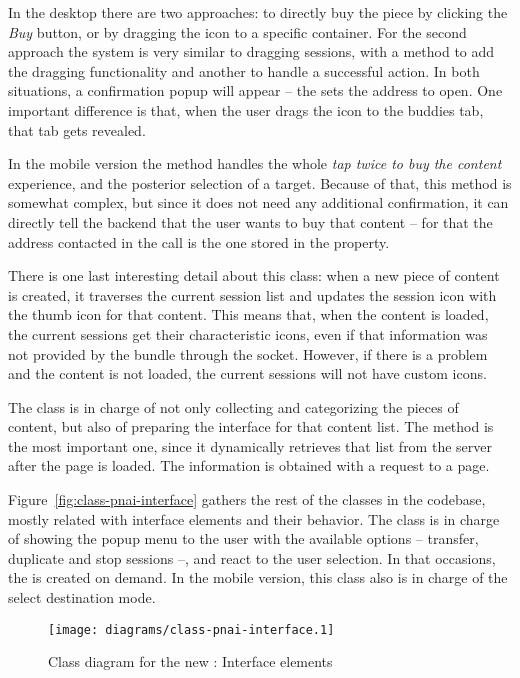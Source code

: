 In the desktop there are two approaches: to directly buy the piece by clicking the \emph{Buy} button, or by dragging the icon to a specific container.
For the second approach the system is very similar to dragging sessions, with a method to add the dragging functionality and another to handle a successful action.
In both situations, a confirmation popup will appear -- the  sets the address to open.
One important difference is that, when the user drags the icon to the buddies tab, that tab gets revealed.

In the mobile version the  method handles the whole \emph{tap twice to buy the content} experience, and the posterior selection of a target.
Because of that, this method is somewhat complex, but since it does not need any additional confirmation, it can directly tell the backend that the user wants to buy that content -- for that the address contacted in the  call is the one stored in the  property.

There is one last interesting detail about this class: when a new piece of content is created, it traverses the current session list and updates the session icon with the thumb icon for that content.
This means that, when the content is loaded, the current sessions get their characteristic icons, even if that information was not provided by the  bundle through the socket.
However, if there is a problem and the content is not loaded, the current sessions will not have custom icons.

The  class is in charge of not only collecting and categorizing the pieces of content, but also of preparing the interface for that content list.
The  method is the most important one, since it dynamically retrieves that list from the server after the page is loaded.
The information is obtained with a  request to a  page.

Figure~\vref{fig:class-pnai-interface} gathers the rest of the classes in the  codebase, mostly related with interface elements and their behavior.
The  class is in charge of showing the popup menu to the user with the available options -- transfer, duplicate and stop sessions --, and react to the user selection.
In that occasions, the  is created on demand.
In the mobile version, this class also is in charge of the select destination mode.

\begin{figure}[htbp]
  \centering
    \texttt{[image: diagrams/class-pnai-interface.1]}
  \caption{Class diagram for the new : Interface elements}
  \label{fig:class-pnai-interface}
\end{figure}

